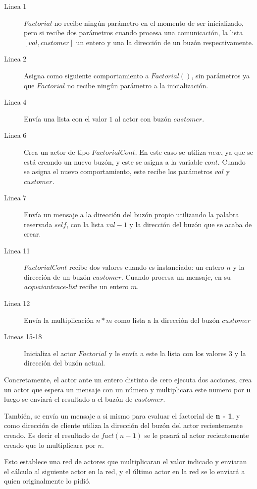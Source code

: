 \begin{description}

\item [Linea 1] $Factorial$ no recibe ningún parámetro en el momento de ser inicializado, pero si recibe dos parámetros cuando procesa una comunicación, la lista $[val, customer]$ un entero y una la dirección de un buzón respectivamente.
\item [Linea 2] Asigna como siguiente comportamiento a $Factorial()$, sin parámetros ya que $Factorial$ no recibe ningún parámetro a la inicialización.  
\item [Linea 4] Envía una lista con el valor $1$ al actor con buzón $customer$.
\item [Linea 6] Crea un actor de tipo $FactorialCont$. En este caso se utiliza $new$, ya que se está creando un nuevo buzón, y este se asigna a la variable $cont$. Cuando se asigna el nuevo comportamiento, este recibe los parámetros $val$ y $customer$.
\item [Linea 7] Envía un mensaje a la dirección del buzón propio utilizando la palabra reservada $self$, con la lista $val - 1$ y la dirección del buzón que se acaba de crear.
\item [Linea 11] $FactorialCont$ recibe dos valores cuando es instanciado: un entero $n$ y la dirección de un buzón $customer$. Cuando procesa un mensaje, en su \textit{acquaiantence-list} recibe un entero $m$.
\item [Linea 12] Envía la multiplicación $n*m$ como lista a la dirección del buzón $customer$ 
\item [Lineas 15-18] Inicializa el actor $Factorial$ y le envía a este la lista con los valores $3$ y la dirección del buzón actual. 

\end{description}

Concretamente, el actor ante un entero distinto de cero ejecuta dos acciones, crea un actor que espera un mensaje con un número y multiplicara este numero por \textbf{n} luego se enviará el resultado a el buzón de $customer$.

También, se envía un mensaje a si mismo para evaluar el factorial de \textbf{n - 1}, y como dirección de cliente utiliza la dirección del buzón del actor recientemente creado. Es decir el resultado de $fact(n - 1)$ se le pasará al actor recientemente creado que lo multiplicara por $n$.

Esto establece una red de actores que multiplicaran el valor indicado y enviaran el cálculo al siguiente actor en la red, y el último actor en la red se lo enviará a quien originalmente lo pidió.

